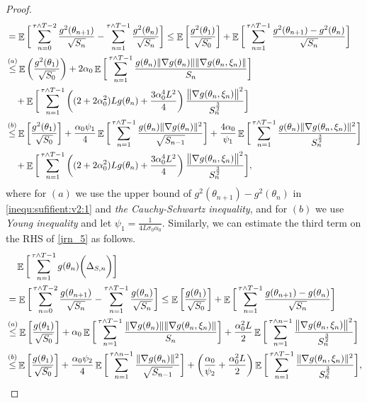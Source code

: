 \documentclass[standalone]{article}
\DeclareMathOperator{\Expect}{\mathbb{E}}
\begin{document}
\begin{proof}
\begin{equation}
\begin{aligned}
& =\Expect\bigg[\sum_{n=0}^{\tau\wedge T-2}\frac{g^{2}(\theta_{n+1})}{\sqrt{S_{n}}}-\sum_{n=1}^{\tau\wedge T-1}\frac{g^{2}(\theta_{n})}{\sqrt{S_{n}}}\bigg] \leq \Expect\bigg[\frac{g^{2}(\theta_{1})}{\sqrt{S_{0}}}\bigg]+\Expect\bigg[\sum_{n=1}^{\tau\wedge T-1}\frac{g^{2}(\theta_{n+1})-g^{2}(\theta_{n})}{\sqrt{S_{n}}}\bigg]\\& \mathop{\le}^{(a)} \Expect\bigg(\frac{g^{2}(\theta_{1})}{\sqrt{S_{0}}}\bigg)+ 2\alpha_0\Expect\bigg[\sum_{n=1}^{\tau\wedge T-1}\frac{g(\theta_{n})\|\nabla g(\theta_{n})\|\|\nabla g(\theta_{n},\xi_{n})\|}{S_{n}}\bigg] \\&\quad +\Expect\bigg[\sum_{n=1}^{\tau\wedge T-1}\left((2+2\alpha_0^2) Lg(\theta_n) + \frac{3\alpha_0^4 L^2}{4} \right)\frac{\big\|\nabla g(\theta_{n},\xi_{n})\big\|^{2}}{S_{n}^{\frac{3}{2}}}\bigg]\\& \mathop{\le}^{(b)} \Expect\bigg[\frac{g^{2}(\theta_{1})}{\sqrt{S_{0}}}\bigg]+\frac{\alpha_{0}\psi_1}{4}\Expect\bigg[\sum_{n=1}^{\tau\wedge T-1}\frac{g(\theta_{n})\|\nabla g(\theta_{n})\|^{2}}{\sqrt{S_{n-1}}}\bigg]+\frac{4\alpha_0}{\psi_1} \Expect\bigg[\sum_{n=1}^{\tau\wedge T-1}\frac{g(\theta_{n})\|\nabla g(\theta_{n},\xi_{n})\|^{2}}{S_{n}^{\frac{3}{2}}}\bigg] \notag \\
& \quad +\Expect\bigg[\sum_{n=1}^{\tau\wedge T-1}\left((2+2\alpha_0^2) Lg(\theta_n) + \frac{3\alpha_0^4 L^2}{4} \right)\frac{\big\|\nabla g(\theta_{n},\xi_{n})\big\|^{2}}{S_{n}^{\frac{3}{2}}}\bigg],
\end{aligned}\end{equation}
where for $(a)$ we use the upper bound of $g^2(\theta_{n+1}) - g^2(\theta_n)$ in \cref{inequ:sufifient:v2:1} and \emph{the Cauchy-Schwartz inequality}, and for $(b)$ we use \emph{Young inequality} and let $\psi_1 = \frac{1}{4 L\sigma_0\alpha_0}$. 
Similarly, we can estimate the third term on the RHS of \cref{jrn_5} as follows.
\begin{equation}\label{jrn_6:v1}\begin{aligned}
&\quad\Expect\bigg[\sum_{n=1}^{\tau\wedge T-1}g(\theta_{n})\bigg(\Delta_{S, n}\bigg)\bigg] \notag \\
& =\Expect\bigg[\sum_{n=0}^{\tau\wedge T-2}\frac{g(\theta_{n+1})}{\sqrt{S_{n}}}-\sum_{n=1}^{\tau\wedge T-1}\frac{g(\theta_{n})}{\sqrt{S_{n}}}\bigg] \leq \Expect\bigg[\frac{g(\theta_{1})}{\sqrt{S_{0}}}\bigg]+\Expect\bigg[\sum_{n=1}^{\tau\wedge T-1}\frac{g(\theta_{n+1})-g(\theta_{n})}{\sqrt{S_{n}}}\bigg]\\& \mathop{\le}^{(a)} \Expect\bigg[\frac{g(\theta_{1})}{\sqrt{S_{0}}}\bigg]+ \alpha_0\Expect\bigg[\sum_{n=1}^{\tau\wedge T-1}\frac{\|\nabla g(\theta_{n})\|\|\nabla g(\theta_{n},\xi_{n})\|}{S_{n}}\bigg] +\frac{\alpha_0^2 L}{2}\Expect\bigg[\sum_{n=1}^{\tau\wedge n-1}\frac{\big\|\nabla g(\theta_{n},\xi_{n})\big\|^{2}}{S_{n}^{\frac{3}{2}}}\bigg]\\& \mathop{\le}^{(b)} \Expect\bigg[\frac{g(\theta_{1})}{\sqrt{S_{0}}}\bigg]+\frac{\alpha_{0}\psi_2}{4}\Expect\bigg[\sum_{n=1}^{\tau\wedge n-1}\frac{\|\nabla g(\theta_{n})\|^{2}}{\sqrt{S_{n-1}}}\bigg]+\left(\frac{\alpha_0}{\psi_2}  + \frac{\alpha_0^2 L}{2}\right)\Expect\bigg[\sum_{n=1}^{\tau\wedge T-1}\frac{\|\nabla g(\theta_{n},\xi_{n})\|^{2}}{S_{n}^{\frac{3}{2}}}\bigg],

\end{aligned}
\end{equation}
\end{proof}
\end{document}
